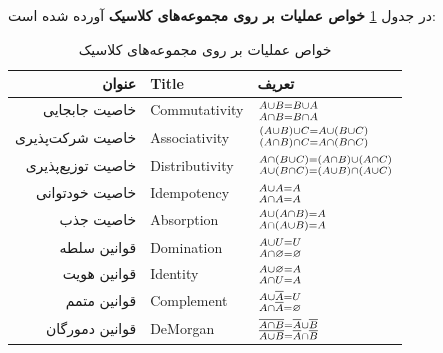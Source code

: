 \documentclass[12pt,a4paper]{article}
\theoremstyle{definition}
\begin{document}
 در جدول
\ref{table:t_classic_properties}
\textbf{خواص عملیات بر روی مجموعه‌های کلاسیک} 
آورده شده‌ است:
\begin{table}[!htbp]
	{\normalsize
		\begin{center}
			\begin{tabular}{r l l} \hline
				عنوان & Title & تعریف  
				\\\hline 
	خاصیت جابجایی &
				Commutativity &
				 $ A \cup B = B \cup A \atop
				 A \cap B = B \cap A $
				\\
			خاصیت شرکت‌پذیری &
			   Associativity &
				$(A \cup B) \cup C = A \cup (B \cup C) \atop
				(A \cap B) \cap C = A \cap (B \cap C) $ 
				\\
				خاصیت توزیع‌پذیری &
				Distributivity &
				$A \cap (B \cup C) = (A \cap B) \cup (A \cap C) \atop
				A \cup (B \cap C) = (A \cup B) \cap (A \cup C)$
				\\
				خاصیت خودتوانی &
				Idempotency &
				$ A \cup A = A \atop
				A \cap A = A$ 
				\\
				خاصیت جذب & 
				Absorption &
				$ A \cup (A \cap B) = A \atop
				 A \cap (A \cup B) = A$ 
				\\
				قوانین سلطه&
			    Domination &
				$ A \cup U = U \atop
			    A \cap \varnothing = \varnothing $ 
				\\
				قوانین هویت &
				Identity &
				$ A \cup \varnothing = A  \atop
				 A \cap U = A $
				\\
				قوانین متمم &
				Complement &
				$ A \cup \overline{A} = U \atop
				 A \cap \overline{A} = \varnothing $
				\\
			قوانین دمورگان &
		    	DeMorgan&
				$ \overline{A \cap B} = \overline{A} \cup \overline{B} \atop
				\overline{A \cup B} = \overline{A} \cap \overline{B} $ 
				\\\hline
\end{tabular}
\caption{خواص عملیات بر روی مجموعه‌های کلاسیک}
\label{table:t_classic_properties}
\end{center}
}
\end{table} 				
\\
\end{document}

